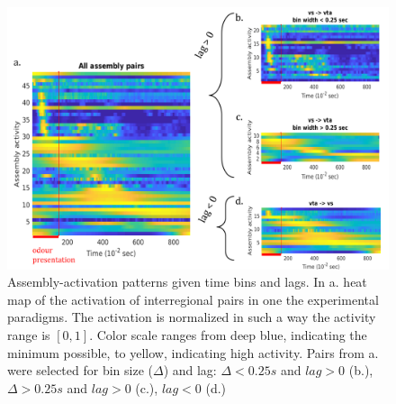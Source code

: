\begin{figure}[h!]
    \centering
    \includegraphics[scale=0.52]{figures/AsActPerBinLag1.png}
    \caption{Assembly-activation patterns given time bins and lags. In a. heat map of the activation of interregional pairs in one the experimental paradigms. The activation is normalized in such a way the activity range is $[0,1]$. Color scale ranges from deep blue, indicating the minimum possible, to yellow, indicating high activity. Pairs from a. were selected for bin size ($\Delta$) and lag: $\Delta < 0.25 s$ and $lag > 0$ (b.), $\Delta > 0.25 s$ and $lag > 0$ (c.), $lag < 0$ (d.)}
    \label{fig:AsActBinLag}
\end{figure}

